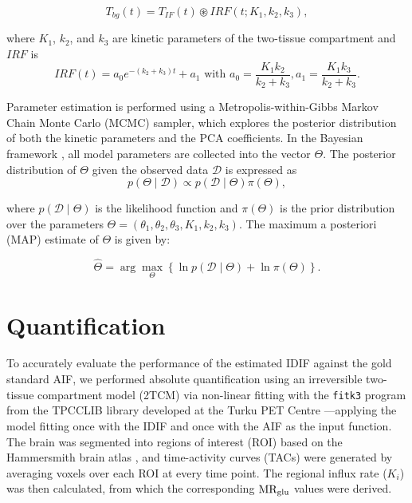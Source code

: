 \begin{equation}
	T_{bg}(t) = T_{IF}(t) \circledast IRF(t; K_1, k_2, k_3),
\end{equation}

where $K_1$, $k_2$, and $k_3$ are kinetic parameters of the two-tissue compartment and $IRF$ is
\begin{equation}
	IRF(t) = a_0 e^{-(k_2+k_3)t} + a_1\text{ with } a_0= \frac{K_1 k_2}{k_2+k_3}, a_1= \frac{K_1 k_3}{k_2+k_3}.
\end{equation}



Parameter estimation is performed using a Metropolis-within-Gibbs Markov Chain Monte Carlo (MCMC) sampler, which explores the posterior distribution of both the kinetic parameters and the PCA coefficients.
In the Bayesian framework \cite{irace2021bayesian}, all model parameters are collected into the vector $\Theta$. The posterior distribution of $\Theta$ given the observed data $\mathcal{D}$ is expressed as
\begin{equation}
	p(\Theta \mid \mathcal{D}) \propto p(\mathcal{D} \mid \Theta) \pi(\Theta),
\end{equation}

where \( p(\mathcal{D} \mid \Theta) \) is the likelihood function and \( \pi(\Theta) \) is the prior distribution over the parameters \( \Theta = (\theta_{1}, \theta_{2}, \theta_{3}, K_{1}, k_{2}, k_{3}) \). The maximum a posteriori (MAP) estimate of \( \Theta \) is given by:

\begin{equation}
	\hat{\Theta}
	=
	\arg\max_{\Theta}
	\left\{
	\ln p(\mathcal{D} \mid \Theta)
	+
	\ln \pi(\Theta)
	\right\}.
\end{equation}

\section{Quantification}
To accurately evaluate the performance of the estimated IDIF against the gold standard AIF, we performed absolute quantification using an irreversible two-tissue compartment model (2TCM) via non-linear fitting with the \texttt{fitk3} program from the TPCCLIB library developed at the Turku PET Centre \cite{oikonen2018tpcclib}—applying the model fitting once with the IDIF and once with the AIF as the input function.
The brain was segmented into regions of interest (ROI) based on the Hammersmith brain atlas \cite{TODO}, and time-activity curves (TACs) were generated by averaging voxels over each ROI at every time point.
The regional influx rate (\(K_i\)) was then calculated, from which the corresponding \(\text{MR}_{\text{glu}}\) values were derived.


